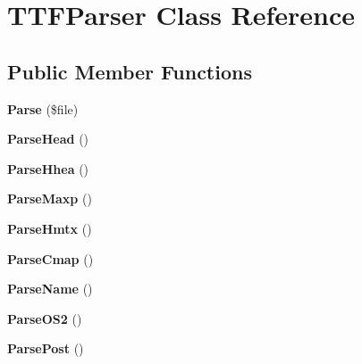 \hypertarget{classTTFParser}{}\section{T\+T\+F\+Parser Class Reference}
\label{classTTFParser}
\subsection*{Public Member Functions}
\begin{DoxyCompactItemize}
\item 
\hypertarget{classTTFParser_a00bf92696c4f3d48c5180821de2ce840}{}{\bfseries Parse} (\$file)\label{classTTFParser_a00bf92696c4f3d48c5180821de2ce840}

\item 
\hypertarget{classTTFParser_ae87aa2ef8fef27cff059106d57d1303c}{}{\bfseries Parse\+Head} ()\label{classTTFParser_ae87aa2ef8fef27cff059106d57d1303c}

\item 
\hypertarget{classTTFParser_a5068ab1775e58f2ddf8a5c2a74e11c43}{}{\bfseries Parse\+Hhea} ()\label{classTTFParser_a5068ab1775e58f2ddf8a5c2a74e11c43}

\item 
\hypertarget{classTTFParser_a45ca897180839588639c1c6a1fcaaf8b}{}{\bfseries Parse\+Maxp} ()\label{classTTFParser_a45ca897180839588639c1c6a1fcaaf8b}

\item 
\hypertarget{classTTFParser_adb82cd858d9cbab2cf350202662a8959}{}{\bfseries Parse\+Hmtx} ()\label{classTTFParser_adb82cd858d9cbab2cf350202662a8959}

\item 
\hypertarget{classTTFParser_af35ff7a233c6de7751e4df1ead414315}{}{\bfseries Parse\+Cmap} ()\label{classTTFParser_af35ff7a233c6de7751e4df1ead414315}

\item 
\hypertarget{classTTFParser_a1bf8839b790543a35722529d151cd0df}{}{\bfseries Parse\+Name} ()\label{classTTFParser_a1bf8839b790543a35722529d151cd0df}

\item 
\hypertarget{classTTFParser_aeeb7b994865c9690f4c5e7877c89e0a6}{}{\bfseries Parse\+O\+S2} ()\label{classTTFParser_aeeb7b994865c9690f4c5e7877c89e0a6}

\item 
\hypertarget{classTTFParser_aecfdf351bb047a3c72cbc9db0ae75e46}{}{\bfseries Parse\+Post} ()\label{classTTFParser_aecfdf351bb047a3c72cbc9db0ae75e46}


\end{DoxyCompactItemize}
